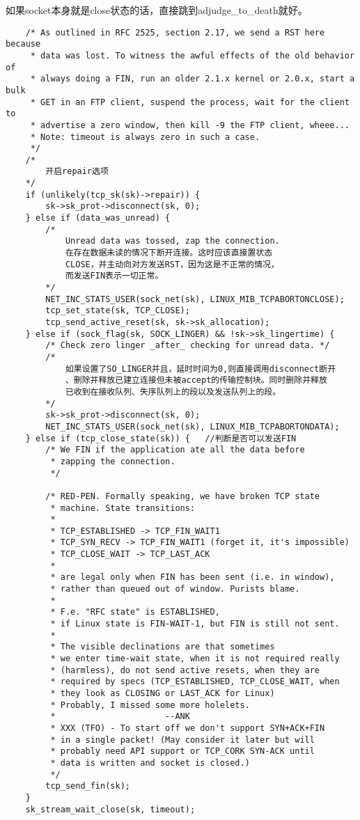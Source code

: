         如果socket本身就是close状态的话，直接跳到adjudge\_to\_death就好。

\begin{verbatim}
    /* As outlined in RFC 2525, section 2.17, we send a RST here because
     * data was lost. To witness the awful effects of the old behavior of
     * always doing a FIN, run an older 2.1.x kernel or 2.0.x, start a bulk
     * GET in an FTP client, suspend the process, wait for the client to
     * advertise a zero window, then kill -9 the FTP client, wheee...
     * Note: timeout is always zero in such a case.
     */
	/*
		开启repair选项
	*/
    if (unlikely(tcp_sk(sk)->repair)) {
        sk->sk_prot->disconnect(sk, 0);
    } else if (data_was_unread) {
        /* 
			Unread data was tossed, zap the connection. 
			在存在数据未读的情况下断开连接。这时应该直接置状态
			CLOSE，并主动向对方发送RST，因为这是不正常的情况，
			而发送FIN表示一切正常。
		*/
        NET_INC_STATS_USER(sock_net(sk), LINUX_MIB_TCPABORTONCLOSE);
        tcp_set_state(sk, TCP_CLOSE);
        tcp_send_active_reset(sk, sk->sk_allocation);
    } else if (sock_flag(sk, SOCK_LINGER) && !sk->sk_lingertime) {
        /* Check zero linger _after_ checking for unread data. */
		/*
			如果设置了SO_LINGER并且，延时时间为0,则直接调用disconnect断开
			、删除并释放已建立连接但未被accept的传输控制块。同时删除并释放
			已收到在接收队列、失序队列上的段以及发送队列上的段。
		*/
        sk->sk_prot->disconnect(sk, 0);
        NET_INC_STATS_USER(sock_net(sk), LINUX_MIB_TCPABORTONDATA);
    } else if (tcp_close_state(sk)) {	//判断是否可以发送FIN
        /* We FIN if the application ate all the data before
         * zapping the connection.
         */

        /* RED-PEN. Formally speaking, we have broken TCP state
         * machine. State transitions:
         *
         * TCP_ESTABLISHED -> TCP_FIN_WAIT1
         * TCP_SYN_RECV -> TCP_FIN_WAIT1 (forget it, it's impossible)
         * TCP_CLOSE_WAIT -> TCP_LAST_ACK
         *
         * are legal only when FIN has been sent (i.e. in window),
         * rather than queued out of window. Purists blame.
         *
         * F.e. "RFC state" is ESTABLISHED,
         * if Linux state is FIN-WAIT-1, but FIN is still not sent.
         *
         * The visible declinations are that sometimes
         * we enter time-wait state, when it is not required really
         * (harmless), do not send active resets, when they are
         * required by specs (TCP_ESTABLISHED, TCP_CLOSE_WAIT, when
         * they look as CLOSING or LAST_ACK for Linux)
         * Probably, I missed some more holelets.
         *                      --ANK
         * XXX (TFO) - To start off we don't support SYN+ACK+FIN
         * in a single packet! (May consider it later but will
         * probably need API support or TCP_CORK SYN-ACK until
         * data is written and socket is closed.)
         */
        tcp_send_fin(sk);
    }
    sk_stream_wait_close(sk, timeout);
\end{verbatim}

